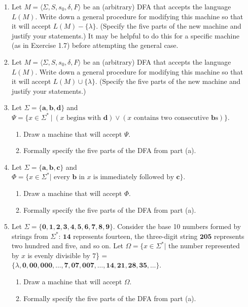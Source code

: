\begin{enumerate}[{1.}1.]
\item Let $M=\langle\Sigma,S,s_0,\delta,F\rangle$ be an (arbitrary) DFA that accepts the
language $L(M)$. Write down a general procedure for modifying this machine so
that it will accept $L(M) - \{\lambda\}$. (Specify the five parts of the new
machine and justify your statements.) It may be helpful to do this for a
specific machine (as in Exercise 1.7) before attempting the general case.

\item Let $M=\langle\Sigma,S,s_0,\delta,F\rangle$ be an (arbitrary) DFA that accepts the
language $L(M)$. Write down a general procedure for modifying this machine so
that it will accept $L(M)\cup\{\lambda\}$. (Specify the five parts of the new
machine and justify your statements.)

\item Let $\Sigma=\{\pmb{a},\pmb{b},\pmb{d}\}$ and $\Psi=\{x\in\Sigma^*
 \ | \ (x\text{ begins with }\pmb{d})\vee(x\text{ contains two consecutive $\pmb{b}$s})\}$.
\begin{enumerate}
\item Draw a machine that will accept $\Psi$.
\item Formally specify the five parts of the DFA from part (a).
\end{enumerate}

\item Let $\Sigma=\{\pmb{a},\pmb{b},\pmb{c}\}$ and $\Phi=\{x \in \Sigma^*
	|\text{ every $\pmb{b}$ in $x$ is immediately followed by }\pmb{c}\}$.
\begin{enumerate}
\item Draw a machine that will accept $\Phi$.
\item Formally specify the five parts of the DFA from part (a).
\end{enumerate}

\item Let $\Sigma=\{\pmb{0},\pmb{1},\pmb{2},\pmb{3},\pmb{4},\pmb{5},\pmb{6},
\pmb{7},\pmb{8},\pmb{9}\}$. Consider the base 10 numbers formed by strings from
$\Sigma^*$: $\pmb{14}$ represents fourteen, the three-digit string $\pmb{205}$
represents two hundred and five, and so on. Let $\Omega=\{x \in \Sigma^*
|$ the number represented by $x$ is evenly divisible by $7$\} = 
$\{\lambda,\pmb{0},\pmb{00},\pmb{000},\ldots,\pmb{7},\pmb{07},\pmb{007},\ldots,
\pmb{14},\pmb{21},\pmb{28},\pmb{35},\ldots\}$.
\begin{enumerate}
\item Draw a machine that will accept $\Omega$.
\item Formally specify the five parts of the DFA from part (a).
\end{enumerate}


\end{enumerate}
